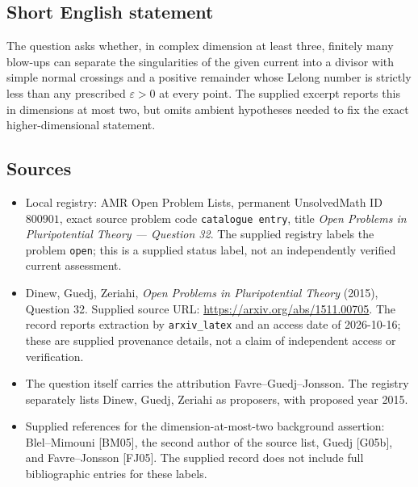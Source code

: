 \documentclass[11pt]{article}
\begin{document}
\subsection{Short English statement}
The question asks whether, in complex dimension at least three, finitely many blow-ups can separate the singularities of the given current into a divisor with simple normal crossings and a positive remainder whose Lelong number is strictly less than any prescribed \(\varepsilon>0\) at every point. The supplied excerpt reports this in dimensions at most two, but omits ambient hypotheses needed to fix the exact higher-dimensional statement.
\subsection{Sources}
\begin{itemize}
\item Local registry: AMR Open Problem Lists, permanent UnsolvedMath ID \(800901\), exact source problem code \texttt{catalogue entry}, title \emph{Open Problems in Pluripotential Theory --- Question 32}. The supplied registry labels the problem \texttt{open}; this is a supplied status label, not an independently verified current assessment.
\item Dinew, Guedj, Zeriahi, \emph{Open Problems in Pluripotential Theory} (2015), Question 32. Supplied source URL: \url{https://arxiv.org/abs/1511.00705}. The record reports extraction by \texttt{arxiv\_latex} and an access date of 2026-10-16; these are supplied provenance details, not a claim of independent access or verification.
\item The question itself carries the attribution Favre--Guedj--Jonsson. The registry separately lists Dinew, Guedj, Zeriahi as proposers, with proposed year 2015.
\item Supplied references for the dimension-at-most-two background assertion: Blel--Mimouni [BM05], the second author of the source list, Guedj [G05b], and Favre--Jonsson [FJ05]. The supplied record does not include full bibliographic entries for these labels.
\end{itemize}
\end{document}
